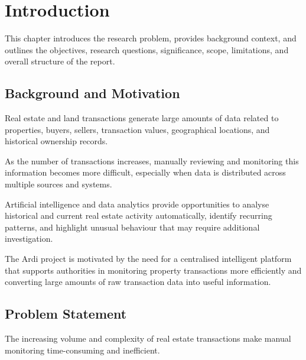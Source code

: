 \documentclass[12pt,a4paper,oneside]{report}
\begin{document}

\setcounter{page}{1}


\chapter{Introduction}

This chapter introduces the research problem, provides background
context, and outlines the objectives, research questions, significance,
scope, limitations, and overall structure of the report.

\section{Background and Motivation}

Real estate and land transactions generate large amounts of data
related to properties, buyers, sellers, transaction values,
geographical locations, and historical ownership records.

As the number of transactions increases, manually reviewing and
monitoring this information becomes more difficult, especially when
data is distributed across multiple sources and systems.

Artificial intelligence and data analytics provide opportunities to
analyse historical and current real estate activity automatically,
identify recurring patterns, and highlight unusual behaviour that may
require additional investigation.

The Ardi project is motivated by the need for a centralised intelligent
platform that supports authorities in monitoring property transactions
more efficiently and converting large amounts of raw transaction data
into useful information.

\section{Problem Statement}

The increasing volume and complexity of real estate transactions make
manual monitoring time-consuming and inefficient.
\end{document}
